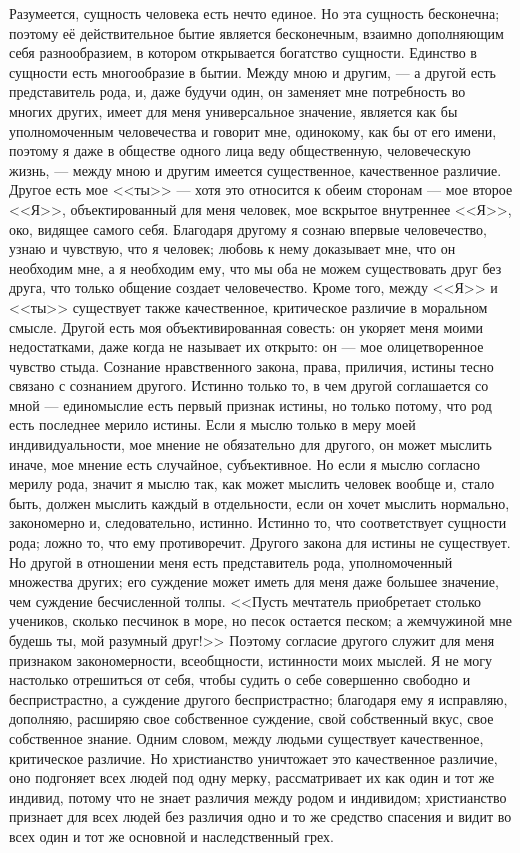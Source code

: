 \documentclass[12pt,oneside]{book}
\begin{document}
Разумеется, сущность человека есть нечто единое. Но эта сущность бесконечна; поэтому её действительное бытие является бесконечным, взаимно дополняющим себя разнообразием, в котором открывается богатство сущности. Единство в сущности есть многообразие в бытии. Между мною и другим, --- а другой есть представитель рода, и, даже будучи один, он заменяет мне потребность во многих других, имеет для меня универсальное значение, является как бы уполномоченным человечества и говорит мне, одинокому, как бы от его имени, поэтому я даже в обществе одного лица веду общественную, человеческую жизнь, --- между мною и другим имеется существенное, качественное различие. Другое есть мое <<ты>> --- хотя это относится к обеим сторонам --- мое второе <<Я>>, объектированный для меня человек, мое вскрытое внутреннее <<Я>>, око, видящее самого себя. Благодаря другому я сознаю впервые человечество, узнаю и чувствую, что я человек; любовь к нему доказывает мне, что он необходим мне, а я необходим ему, что мы оба не можем существовать друг без друга, что только общение создает человечество. Кроме того, между <<Я>> и <<ты>> существует также качественное, критическое различие в моральном смысле. Другой есть моя объективированная совесть: он укоряет меня моими недостатками, даже когда не называет их открыто: он --- мое олицетворенное чувство стыда. Сознание нравственного закона, права, приличия, истины тесно связано с сознанием другого. Истинно только то, в чем другой соглашается со мной --- единомыслие есть первый признак истины, но только потому, что род есть последнее мерило истины. Если я мыслю только в меру моей индивидуальности, мое мнение не обязательно для другого, он может мыслить иначе, мое мнение есть случайное, субъективное. Но если я мыслю согласно мерилу рода, значит я мыслю так, как может мыслить человек вообще и, стало быть, должен мыслить каждый в отдельности, если он хочет мыслить нормально, закономерно и, следовательно, истинно. Истинно то, что соответствует сущности рода; ложно то, что ему противоречит. Другого закона для истины не существует. Но другой в отношении меня есть представитель рода, уполномоченный множества других; его суждение может иметь для меня даже большее значение, чем суждение бесчисленной толпы. <<Пусть мечтатель приобретает столько учеников, сколько песчинок в море, но песок остается песком; а жемчужиной мне будешь ты, мой разумный друг!>> Поэтому согласие другого служит для меня признаком закономерности, всеобщности, истинности моих мыслей. Я не могу настолько отрешиться от себя, чтобы судить о себе совершенно свободно и беспристрастно, а суждение другого беспристрастно; благодаря ему я исправляю, дополняю, расширяю свое собственное суждение, свой собственный вкус, свое собственное знание. Одним словом, между людьми существует качественное, критическое различие. Но христианство уничтожает это качественное различие, оно подгоняет всех людей под одну мерку, рассматривает их как один и тот же индивид, потому что не знает различия между родом и индивидом; христианство признает для всех людей без различия одно и то же средство спасения и видит во всех один и тот же основной и наследственный грех.
\end{document}

